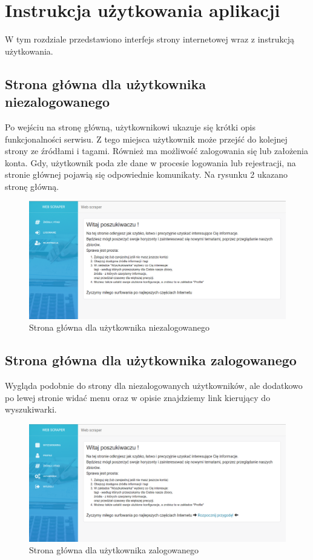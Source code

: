\documentclass[12pt, titlepage]{article}
\begin{document}
	\newpage
	\section{Instrukcja użytkowania aplikacji}
	W tym rozdziale przedstawiono interfejs strony internetowej wraz z instrukcją użytkowania.
	\subsection{Strona główna dla użytkownika niezalogowanego}
	Po wejściu na stronę główną, użytkownikowi ukazuje się krótki opis funkcjonalności serwisu. Z tego miejsca użytkownik może przejść do kolejnej strony ze źródłami i tagami. Również ma możliwość zalogowania się lub założenia konta. Gdy, użytkownik poda złe dane w procesie logowania lub rejestracji, na stronie głównej pojawią się odpowiednie komunikaty. Na rysunku 2 ukazano stronę główną.
	\begin{figure}[H]
		\centering
		\includegraphics[scale=0.40]{obrazki/stronaGlowna_niezalogowany.png}
		\caption{Strona główna dla użytkownika niezalogowanego}
		\label{fig:db_schema}
	\end{figure}
	
	\subsection{Strona główna dla użytkownika zalogowanego}
	Wygląda podobnie do strony dla niezalogowanych użytkowników, ale dodatkowo po lewej stronie widać menu oraz w opisie znajdziemy link kierujący do wyszukiwarki.
	\begin{figure}[H]
		\centering
		\includegraphics[scale=0.40]{obrazki/stronaGlowna_zalogowany.png}
		\caption{Strona główna dla użytkownika zalogowanego}
		\label{fig:db_schema}
	\end{figure}
\end{document}
